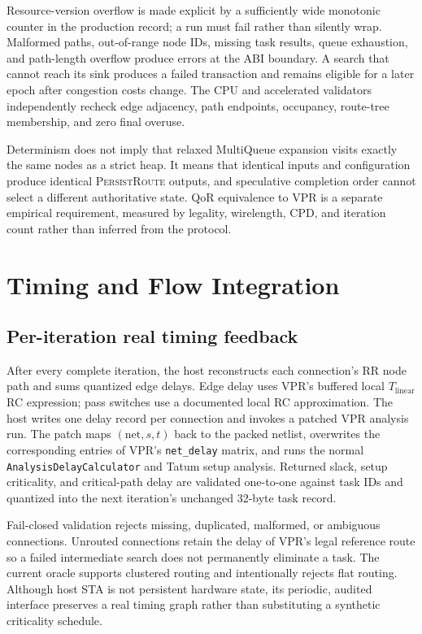 \documentclass[sigconf,anonymous,review]{acmart}
\newcommand{\system}{\textsc{PersistRoute}}
\begin{document}
Resource-version overflow is made explicit by a sufficiently wide monotonic
counter in the production record; a run must fail rather than silently wrap.
Malformed paths, out-of-range node IDs, missing task results, queue exhaustion,
and path-length overflow produce errors at the ABI boundary. A search that
cannot reach its sink produces a failed transaction and remains eligible for a
later epoch after congestion costs change. The CPU and accelerated validators
independently recheck edge adjacency, path endpoints, occupancy, route-tree
membership, and zero final overuse.

Determinism does not imply that relaxed MultiQueue expansion visits exactly the
same nodes as a strict heap. It means that identical inputs and configuration
produce identical \system{} outputs, and speculative completion order cannot
select a different authoritative state. QoR equivalence to VPR is a separate
empirical requirement, measured by legality, wirelength, CPD, and iteration
count rather than inferred from the protocol.

\section{Timing and Flow Integration}

\subsection{Per-iteration real timing feedback}

After every complete iteration, the host reconstructs each connection's RR
node path and sums quantized edge delays. Edge delay uses VPR's buffered local
$T_{\mathrm{linear}}$ RC expression; pass switches use a documented local RC
approximation. The host writes one delay record per connection and invokes a
patched VPR analysis run. The patch maps $(\text{net},s,t)$ back to the packed
netlist, overwrites the corresponding entries of VPR's \texttt{net\_delay}
matrix, and runs the normal \texttt{AnalysisDelayCalculator} and Tatum setup
analysis. Returned slack, setup criticality, and critical-path delay are
validated one-to-one against task IDs and quantized into the next iteration's
unchanged 32-byte task record.

Fail-closed validation rejects missing, duplicated, malformed, or ambiguous
connections. Unrouted connections retain the delay of VPR's legal reference
route so a failed intermediate search does not permanently eliminate a task.
The current oracle supports clustered routing and intentionally rejects flat
routing. Although host STA is not persistent hardware state, its periodic,
audited interface preserves a real timing graph rather than substituting a
synthetic criticality schedule.
\end{document}
